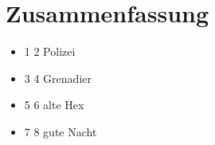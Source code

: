 \chapter{Zusammenfassung}
\begin{itemize}
  \item 1 2 Polizei
  \item 3 4 Grenadier
  \item 5 6 alte Hex
  \item 7 8 gute Nacht
\end{itemize}
